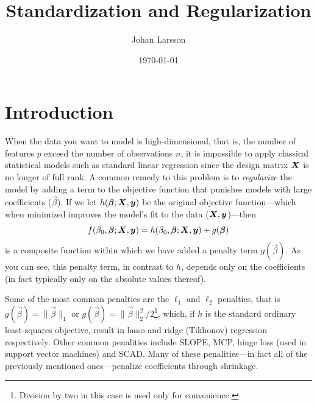 


\title{Standardization and Regularization}
\author[1,*]{Johan Larsson}
\date{\today}

% 



\maketitle

\section{Introduction}

When the data you want to model is high-dimensional, that is, the number of features \(p\) exceed the number of observations \(n\), it is impossible to apply classical statistical models such as standard linear regression since the design matrix \(\mat X\) is no longer of full rank. A common remedy to this problem is to \emph{regularize} the model by adding a term to the objective function that punishes models with large coefficients (\(\vec\beta\)). If we let \(h(\vec\beta; \mat X, \vec y)\) be the original objective function---which when minimized improves the model's fit to the data (\(\mat X, \vec y\))---then
\[
  f(\beta_0, \vec\beta; \mat X, \vec y) = h(\beta_0, \vec\beta; \mat X, \vec y) + g(\vec\beta)
\]
is a composite function within which we have added a penalty term \(g(\vec\beta)\). As you can see, this penalty term, in contrast to \(h\), depends only on the coefficients (in fact typically only on the absolute values thereof).

Some of the most common penalties are the \(\ell_1\) and \(\ell_2\) penalties, that is \(g(\vec\beta) = \lVert \vec\beta \rVert_1\) or \(g(\vec\beta) = \lVert \vec\beta \rVert_2^2/2\)\footnote{Division by two in this case is used only for convenience.}, which, if \(h\) is the standard ordinary least-squares objective, result in lasso and ridge (Tikhonov) regression respectively. Other common penalities include SLOPE, MCP, hinge loss (used in support vector machines) and SCAD. Many of these penalities---in fact all of the previously mentioned ones---penalize coefficients through shrinkage.

